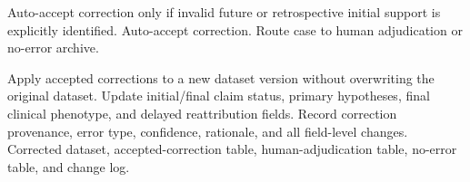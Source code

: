 \begin{algorithm}[t]
\begin{algorithmic}[1]
            \State Auto-accept correction only if invalid future or retrospective initial support is explicitly identified.
        \Else
            \State Auto-accept correction.
        \EndIf
    \Else
        \State Route case to human adjudication or no-error archive.
    \EndIf
\EndFor

\State Apply accepted corrections to a new dataset version without overwriting the original dataset.
\State Update initial/final claim status, primary hypotheses, final clinical phenotype, and delayed reattribution fields.
\State Record correction provenance, error type, confidence, rationale, and all field-level changes.
\State \Return Corrected dataset, accepted-correction table, human-adjudication table, no-error table, and change log.
\end{algorithmic}
\end{algorithm}

